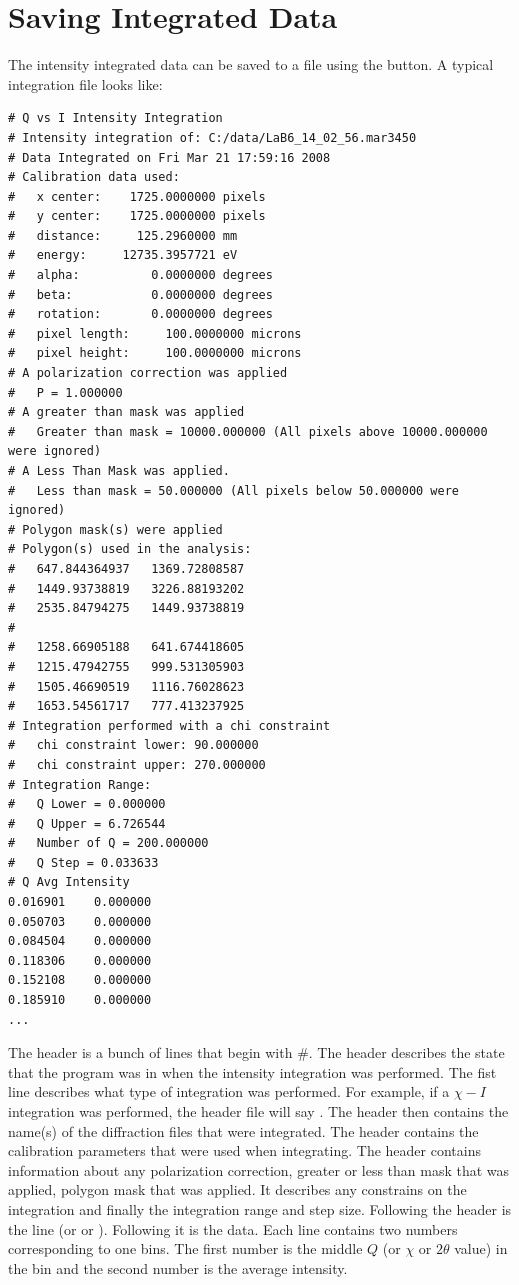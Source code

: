 \section{Saving Integrated Data}

The intensity integrated data can be saved to a file
using the  button. 
A typical integration file looks like:
\begin{lstlisting}[caption={'A Cake Data File'}]
# Q vs I Intensity Integration
# Intensity integration of: C:/data/LaB6_14_02_56.mar3450 
# Data Integrated on Fri Mar 21 17:59:16 2008
# Calibration data used:
#   x center:    1725.0000000 pixels
#   y center:    1725.0000000 pixels
#   distance:     125.2960000 mm
#   energy:     12735.3957721 eV
#   alpha:          0.0000000 degrees
#   beta:           0.0000000 degrees
#   rotation:       0.0000000 degrees
#   pixel length:     100.0000000 microns
#   pixel height:     100.0000000 microns
# A polarization correction was applied
#   P = 1.000000
# A greater than mask was applied
#   Greater than mask = 10000.000000 (All pixels above 10000.000000 were ignored)
# A Less Than Mask was applied.
#   Less than mask = 50.000000 (All pixels below 50.000000 were ignored)
# Polygon mask(s) were applied
# Polygon(s) used in the analysis:
#   647.844364937	1369.72808587
#   1449.93738819	3226.88193202
#   2535.84794275	1449.93738819
#
#   1258.66905188	641.674418605
#   1215.47942755	999.531305903
#   1505.46690519	1116.76028623
#   1653.54561717	777.413237925
# Integration performed with a chi constraint
#   chi constraint lower: 90.000000
#   chi constraint upper: 270.000000
# Integration Range:
#   Q Lower = 0.000000
#   Q Upper = 6.726544
#   Number of Q = 200.000000
#   Q Step = 0.033633
# Q	Avg Intensity
0.016901	0.000000
0.050703	0.000000
0.084504	0.000000
0.118306	0.000000
0.152108	0.000000
0.185910	0.000000
...
\end{lstlisting}
The header is a bunch of lines that begin with \#.
The header describes the state that the program was
in when the intensity integration was performed.
The fist line describes what type of integration was
performed. For example, if a $\chi-I$ integration was 
performed, the header file will say
.
The header then contains the name(s) of the diffraction
files that were integrated. The header contains the
calibration parameters that were used when integrating.
The header contains information about any polarization
correction, greater or less than mask that was applied,
polygon mask that was applied. It describes any constrains 
on the integration and finally the integration range and 
step size.  Following the header is the line
 (or 
or ). Following it is
the data. Each line contains two numbers corresponding to one bins. 
The first number is the middle $Q$ (or $\chi$ or $2\theta$ value) 
in the bin and the second number is the average intensity.



